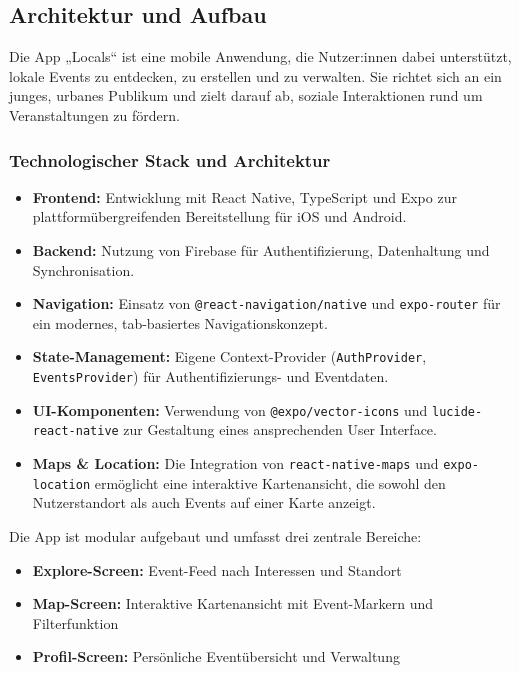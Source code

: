 \subsection{Architektur und Aufbau}
Die App „Locals“ ist eine mobile Anwendung, die Nutzer:innen dabei unterstützt,
lokale Events zu entdecken, zu erstellen und zu verwalten. Sie richtet sich an
ein junges, urbanes Publikum und zielt darauf ab, soziale Interaktionen rund um
Veranstaltungen zu fördern.


\subsubsection{Technologischer Stack und Architektur}

\begin{itemize}
    \item \textbf{Frontend:} Entwicklung mit React Native, TypeScript und Expo zur plattformübergreifenden Bereitstellung für iOS und Android.
    \item \textbf{Backend:} Nutzung von Firebase für Authentifizierung, Datenhaltung und Synchronisation.
    \item \textbf{Navigation:} Einsatz von \texttt{@react-navigation/native} und \texttt{expo-router} für ein modernes, tab-basiertes Navigationskonzept.
    \item \textbf{State-Management:} Eigene Context-Provider (\texttt{AuthProvider}, \texttt{EventsProvider}) für Authentifizierungs- und Eventdaten.
    \item \textbf{UI-Komponenten:} Verwendung von \texttt{@expo/vector-icons} und \texttt{lucide-react-native} zur Gestaltung eines ansprechenden User Interface.
    \item \textbf{Maps \& Location:} Die Integration von \texttt{react-native-maps} und \texttt{expo-location} ermöglicht eine interaktive Kartenansicht, die sowohl den Nutzerstandort als auch Events auf einer Karte anzeigt.
\end{itemize}

Die App ist modular aufgebaut und umfasst drei zentrale Bereiche:
\begin{itemize}
    \item \textbf{Explore-Screen:} Event-Feed nach Interessen und Standort
    \item \textbf{Map-Screen:} Interaktive Kartenansicht mit Event-Markern und Filterfunktion
    \item \textbf{Profil-Screen:} Persönliche Eventübersicht und Verwaltung
\end{itemize}

